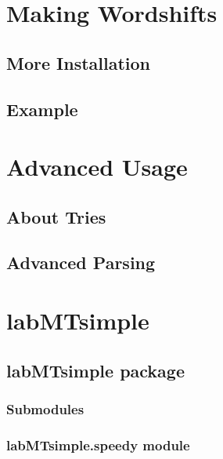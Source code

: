 \documentclass[letterpaper,10pt,english]{sphinxmanual}
\begin{document}
\chapter{Making Wordshifts}
\label{wordshifts::doc}\label{wordshifts:making-wordshifts}

\section{More Installation}
\label{wordshifts:more-installation}

\section{Example}
\label{wordshifts:example}

\chapter{Advanced Usage}
\label{advanced::doc}\label{advanced:advanced-usage}

\section{About Tries}
\label{advanced:about-tries}

\section{Advanced Parsing}
\label{advanced:advanced-parsing}

\chapter{labMTsimple}
\label{modules::doc}\label{modules:labmtsimple}

\section{labMTsimple package}
\label{labMTsimple:labmtsimple-package}\label{labMTsimple::doc}

\subsection{Submodules}
\label{labMTsimple:submodules}

\subsection{labMTsimple.speedy module}
\label{labMTsimple:labmtsimple-speedy-module}\label{labMTsimple:module-labMTsimple.speedy}
\end{document}
